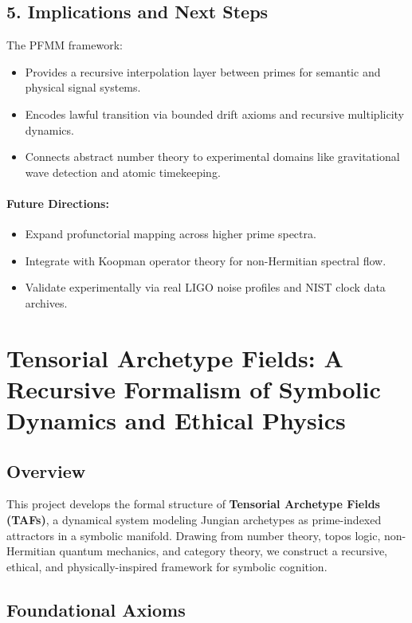 \documentclass{article}
\theoremstyle{plain}
\begin{document}
\subsection{5. Implications and Next Steps}
The PFMM framework:
\begin{itemize}
    \item Provides a recursive interpolation layer between primes for semantic and physical signal systems.
    \item Encodes lawful transition via bounded drift axioms and recursive multiplicity dynamics.
    \item Connects abstract number theory to experimental domains like gravitational wave detection and atomic timekeeping.
\end{itemize}

\paragraph{Future Directions:}
\begin{itemize}
    \item Expand profunctorial mapping across higher prime spectra.
    \item Integrate with Koopman operator theory for non-Hermitian spectral flow.
    \item Validate experimentally via real LIGO noise profiles and NIST clock data archives.
\end{itemize}
\section{Tensorial Archetype Fields: A Recursive Formalism of Symbolic Dynamics and Ethical Physics}

\subsection{Overview}

This project develops the formal structure of \textbf{Tensorial Archetype Fields (TAFs)}, a dynamical system modeling Jungian archetypes as prime-indexed attractors in a symbolic manifold. Drawing from number theory, topos logic, non-Hermitian quantum mechanics, and category theory, we construct a recursive, ethical, and physically-inspired framework for symbolic cognition.

\subsection{Foundational Axioms}
\end{document}
